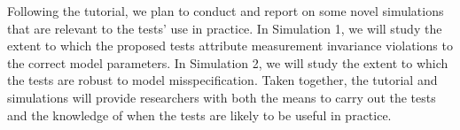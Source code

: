 \documentclass[11pt]{article}
\begin{document}
Following the tutorial, we plan to conduct and report on
some novel simulations that are relevant to the tests' use in practice.  In
Simulation 1, we will study the extent to which the proposed
tests attribute measurement invariance violations to the correct model
parameters.  In Simulation 2, we will study the extent to which the
tests are robust to model misspecification.  Taken together, the
tutorial and simulations will provide researchers with both the means
to carry out the tests and the knowledge of when the tests are likely to
be useful in practice. 


\end{document}
